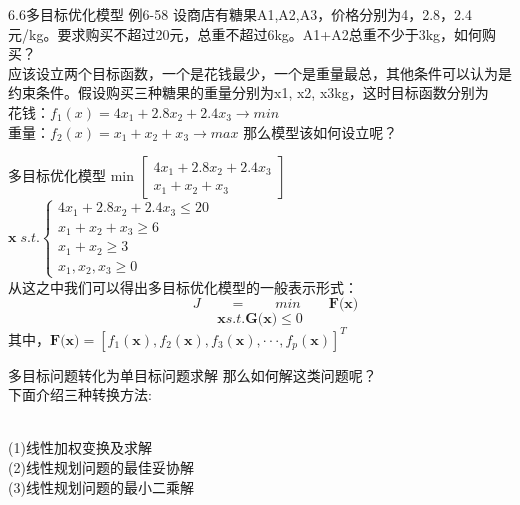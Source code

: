 \documentclass[12pt]{beamer}
\begin{document}
\begin{frame}[allowframebreaks]{6.6多目标优化模型}
例6-58  设商店有糖果A1,A2,A3，价格分别为4，2.8，2.4元/kg。要求购买不超过20元，总重不超过6kg。A1+A2总重不少于3kg，如何购买？
\\应该设立两个目标函数，一个是花钱最少，一个是重量最总，其他条件可以认为是约束条件。假设购买三种糖果的重量分别为x1, x2, x3kg，这时目标函数分别为
\\花钱：$f_1(x) = 4x_1+2.8x_2+2.4x_3 \rightarrow min$
\\重量：$f_2(x) = x_1+x_2+x_3 \rightarrow max$ 
那么模型该如何设立呢？
\end{frame}
\begin{frame}[allowframebreaks]{多目标优化模型}
	\qquad min\qquad \qquad \qquad \qquad \qquad
	$
	\left[
	\begin{array}{ccc}
	4x_1+2.8x_2+2.4x_3	\\
	x_1+x_2+x_3	
	\end{array} 
	\right]
	$
	\\
	$
	\textbf{x}\;s.t.
	\left\{
	\begin{array}{ccc}
	4x_1+2.8x_2+2.4x_3\leq20\\
	x_1+x_2+x_3\geq6\\
	x_1+x_2\geq3 \\
	x_1,x_2,x_3\geq0 
	\end{array} 
	\right.
	$
	\\从这之中我们可以得出多目标优化模型的一般表示形式：
	$$ \qquad \ J\qquad = \qquad min\qquad \textbf{F(x)}$$
	$$ \textbf{x} s.t.  \textbf{G(x)}\leq0$$
	其中，$\textbf{F(x)} = [f_1(\textbf{x}),f_2(\textbf{x}),f_3(\textbf{x}),\cdot \cdot \cdot,f_p(\textbf{x})]^T$
\end{frame}
\begin{frame}[allowframebreaks]{多目标问题转化为单目标问题求解}
	那么如何解这类问题呢？
	\\下面介绍三种转换方法:
	
	\\ \qquad (1)线性加权变换及求解
	\\ \qquad (2)线性规划问题的最佳妥协解
	\\ \qquad (3)线性规划问题的最小二乘解
\end{frame}
\end{document}
